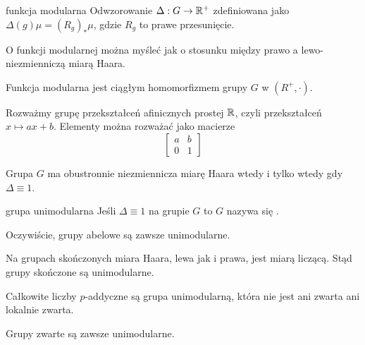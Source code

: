 \begin{definition}{funkcja modularna}{}
  Odwzorowanie $\Delta:G\to \mathbb{R}^+$ zdefiniowana jako $\Delta(g)\mu=(R_g)_*\mu$, gdzie $R_g$ to prawe przesunięcie.
\end{definition}

O funkcji modularnej można myśleć jak o stosunku między prawo a lewo-niezmienniczą miarą Haara.

\begin{lemma}{}{}
  Funkcja modularna jest ciągłym homomorfizmem grupy $G$ w $(R^+, \cdot)$.
\end{lemma}

\begin{example}\color{red}
  Rozważmy grupę przekształceń afinicznych prostej $\mathbb{R}$, czyli przekształceń $x\mapsto ax+b$. Elementy można rozważać jako macierze
  $$\begin{bmatrix}
    a & b \\ 
    0 & 1
  \end{bmatrix}$$
\end{example}

\begin{lemma}{}{}
  Grupa $G$ ma obustronnie niezmiennicza miarę Haara wtedy i tylko wtedy gdy $\Delta\equiv 1$.
\end{lemma}

\begin{definition}{grupa unimodularna}{}
  Jeśli $\Delta\equiv 1$ na grupie $G$ to $G$ nazywa się .
\end{definition}

\begin{example}[m]
  \item Oczywiście, grupy abelowe są zawsze unimodularne.
  \item Na grupach skończonych miara Haara, lewa jak i prawa, jest miarą liczącą. Stąd grupy skończone są unimodularne.
  \item Całkowite liczby $p$-addyczne są grupa unimodularną, która nie jest ani zwarta ani lokalnie zwarta.
\end{example}

\begin{lemma}{}{}
  Grupy zwarte są zawsze unimodularne.
\end{lemma}


%
%



